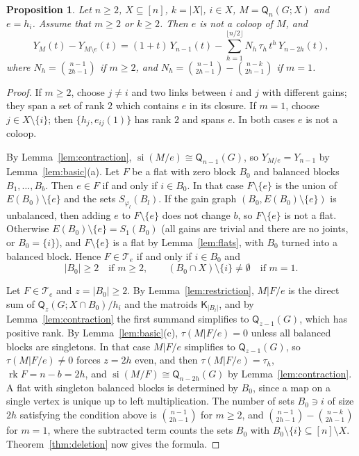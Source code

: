 \documentclass[11pt]{amsart}
\newtheorem{proposition}[theorem]{Proposition}
\theoremstyle{definition}
\theoremstyle{remark}
\numberwithin{equation}{section}
\newcommand{\Q}{\mathsf{Q}}
\newcommand{\K}{\mathsf{K}}
\newcommand{\rk}{\operatorname{rk}}
\newcommand{\si}{\operatorname{si}}
\begin{document}
\begin{proposition}\label{prop:joint-deletion}
Let $n\ge2$, $X\subseteq[n]$, $k=|X|$, $i\in X$, $M=\Q_n(G;X)$ and $e=h_i$. Assume that $m\ge2$ or $k\ge2$. Then $e$ is not a coloop of $M$, and
\[
Y_{M}(t)-Y_{M\setminus e}(t)=(1+t)\,Y_{n-1}(t)-\sum_{h=1}^{\lfloor n/2\rfloor}N_h\,\tau_h\,t^h\,Y_{n-2h}(t),
\]
where $N_h=\binom{n-1}{2h-1}$ if $m\ge2$, and $N_h=\binom{n-1}{2h-1}-\binom{n-k}{2h-1}$ if $m=1$.
\end{proposition}

\begin{proof}
If $m\ge2$, choose $j\ne i$ and two links between $i$ and $j$ with different gains; they span a set of rank $2$ which contains $e$ in its closure. If $m=1$, choose $j\in X\setminus\{i\}$; then $\{h_j,e_{ij}(1)\}$ has rank $2$ and spans $e$. In both cases $e$ is not a coloop.

By Lemma~\ref{lem:contraction}, $\si(M/e)\cong\Q_{n-1}(G)$, so $Y_{M/e}=Y_{n-1}$ by Lemma~\ref{lem:basic}(a). Let $F$ be a flat with zero block $B_0$ and balanced blocks $B_1,\dots,B_b$. Then $e\in F$ if and only if $i\in B_0$. In that case $F\setminus\{e\}$ is the union of $E(B_0)\setminus\{e\}$ and the sets $S_{\varphi_l}(B_l)$. If the gain graph $(B_0,E(B_0)\setminus\{e\})$ is unbalanced, then adding $e$ to $F\setminus\{e\}$ does not change $b$, so $F\setminus\{e\}$ is not a flat. Otherwise $E(B_0)\setminus\{e\}=S_1(B_0)$ (all gains are trivial and there are no joints, or $B_0=\{i\}$), and $F\setminus\{e\}$ is a flat by Lemma~\ref{lem:flats}, with $B_0$ turned into a balanced block. Hence $F\in\mathcal{T}_e$ if and only if $i\in B_0$ and
\[
|B_0|\ge2\quad\text{if }m\ge2,\qquad (B_0\cap X)\setminus\{i\}\neq\emptyset\quad\text{if }m=1.
\]

Let $F\in\mathcal{T}_e$ and $z=|B_0|\ge2$. By Lemma~\ref{lem:restriction}, $M|F/e$ is the direct sum of $\Q_{z}(G;X\cap B_0)/h_i$ and the matroids $\K_{|B_l|}$, and by Lemma~\ref{lem:contraction} the first summand simplifies to $\Q_{z-1}(G)$, which has positive rank. By Lemma~\ref{lem:basic}(c), $\tau(M|F/e)=0$ unless all balanced blocks are singletons. In that case $M|F/e$ simplifies to $\Q_{z-1}(G)$, so $\tau(M|F/e)\ne0$ forces $z=2h$ even, and then $\tau(M|F/e)=\tau_h$, $\rk F=n-b=2h$, and $\si(M/F)\cong\Q_{n-2h}(G)$ by Lemma~\ref{lem:contraction}. A flat with singleton balanced blocks is determined by $B_0$, since a map on a single vertex is unique up to left multiplication. The number of sets $B_0\ni i$ of size $2h$ satisfying the condition above is $\binom{n-1}{2h-1}$ for $m\ge2$, and $\binom{n-1}{2h-1}-\binom{n-k}{2h-1}$ for $m=1$, where the subtracted term counts the sets $B_0$ with $B_0\setminus\{i\}\subseteq[n]\setminus X$. Theorem~\ref{thm:deletion} now gives the formula.
\end{proof}
\end{document}
